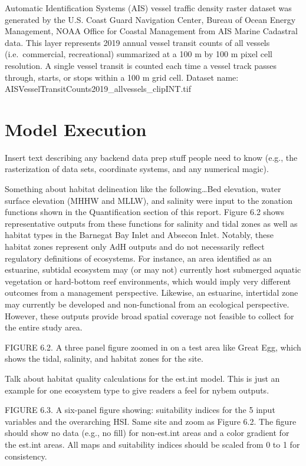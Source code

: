 \documentclass[
]{book}
\begin{document}
Automatic Identification Systems (AIS) vessel traffic density raster dataset was generated by the U.S. Coast Guard Navigation Center, Bureau of Ocean Energy Management, NOAA Office for Coastal Management from AIS Marine Cadastral data. This layer represents 2019 annual vessel transit counts of all vessels (i.e.~commercial, recreational) summarized at a 100 m by 100 m pixel cell resolution. A single vessel transit is counted each time a vessel track passes through, starts, or stops within a 100 m grid cell. Dataset name: AISVesselTransitCounts2019\_allvessels\_clipINT.tif

\hypertarget{model-execution}{%
\section{Model Execution}\label{model-execution}}

Insert text describing any backend data prep stuff people need to know (e.g., the rasterization of data sets, coordinate systems, and any numerical magic).

Something about habitat delineation like the following\ldots Bed elevation, water surface elevation (MHHW and MLLW), and salinity were input to the zonation functions shown in the Quantification section of this report. Figure 6.2 shows representative outputs from these functions for salinity and tidal zones as well as habitat types in the Barnegat Bay Inlet and Absecon Inlet. Notably, these habitat zones represent only AdH outputs and do not necessarily reflect regulatory definitions of ecosystems. For instance, an area identified as an estuarine, subtidal ecosystem may (or may not) currently host submerged aquatic vegetation or hard-bottom reef environments, which would imply very different outcomes from a management perspective. Likewise, an estuarine, intertidal zone may currently be developed and non-functional from an ecological perspective. However, these outputs provide broad spatial coverage not feasible to collect for the entire study area.

{FIGURE 6.2. A three panel figure zoomed in on a test area like Great Egg, which shows the tidal, salinity, and habitat zones for the site.}

Talk about habitat quality calculations for the est.int model. This is just an example for one ecosystem type to give readers a feel for nybem outputs.

{FIGURE 6.3. A six-panel figure showing: suitability indices for the 5 input variables and the overarching HSI. Same site and zoom as Figure 6.2. The figure should show no data (e.g., no fill) for non-est.int areas and a color gradient for the est.int areas. All maps and suitability indices should be scaled from 0 to 1 for consistency.}
\end{document}
